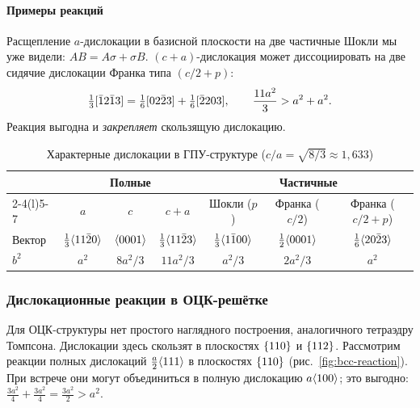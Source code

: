 \paragraph{Примеры реакций}
Расщепление $a$-дислокации в базисной плоскости на две частичные Шокли
мы уже видели: $AB=A\sigma+\sigma B$. $(c+a)$-дислокация может
диссоциировать на две сидячие дислокации Франка типа $(c/2+p)$:
\[
\tfrac13[\bar{1}2\bar{1}3]=\tfrac16[02\bar{2}3]+\tfrac16[\bar{2}203],\qquad
\frac{11a^2}{3}>a^2+a^2 .
\]
Реакция выгодна и \emph{закрепляет} скользящую дислокацию.

\begin{table}[ht]
\centering
\caption{Характерные дислокации в ГПУ-структуре ($c/a=\sqrt{8/3}\approx1{,}633$)}
\label{tab:hcp-disl}
\small
\begin{tabular}{@{}lcccccc@{}}
\toprule
 & \multicolumn{3}{c}{Полные} & \multicolumn{3}{c}{Частичные} \\
\cmidrule(lr){2-4}\cmidrule(l){5-7}
 & $a$ & $c$ & $c+a$ & Шокли ($p$) & Франка ($c/2$) & Франка ($c/2+p$) \\
\midrule
Вектор & $\frac13\langle 11\bar{2}0\rangle$ & $\langle 0001\rangle$ & $\frac13\langle 11\bar{2}3\rangle$ & $\frac13\langle 1\bar{1}00\rangle$ & $\frac12\langle 0001\rangle$ & $\frac16\langle 20\bar{2}3\rangle$ \\[2pt]
$b^2$ & $a^2$ & $8a^2/3$ & $11a^2/3$ & $a^2/3$ & $2a^2/3$ & $a^2$ \\
\bottomrule
\end{tabular}
\end{table}

\subsubsection{Дислокационные реакции в ОЦК-решётке}

Для ОЦК-структуры нет простого наглядного построения, аналогичного
тетраэдру Томпсона. Дислокации здесь скользят в плоскостях $\{110\}$ и
$\{112\}$. Рассмотрим реакции полных дислокаций $\frac a2\langle 111\rangle$ в
плоскостях $\{110\}$ (рис.~\ref{fig:bcc-reaction}). При встрече они
могут объединиться в полную дислокацию $a\langle 100\rangle$; это выгодно:
$\frac{3a^2}4+\frac{3a^2}4=\frac{3a^2}{2}>a^2$.

